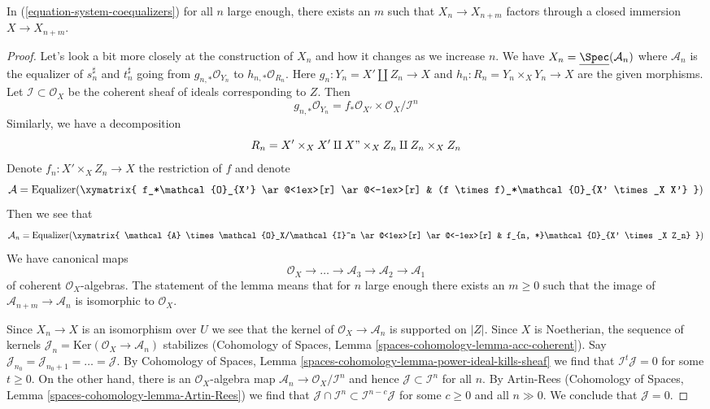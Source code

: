 \begin{lemma}
\label{lemma-essentially-constant}
In (\ref{equation-system-coequalizers}) for all $n$ large enough, there
exists an $m$ such that $X_n \to X_{n + m}$ factors through a
closed immersion $X \to X_{n + m}$.
\end{lemma}

\begin{proof}
Let's look a bit more closely at the construction of $X_n$
and how it changes as we increase $n$. We have
$X_n = \underline{\Spec}(\mathcal{A}_n)$
where $\mathcal{A}_n$ is the equalizer of $s_n^\sharp$ and $t_n^\sharp$
going from $g_{n , *}\mathcal{O}_{Y_n}$ to $h_{n, *}\mathcal{O}_{R_n}$.
Here $g_n : Y_n = X' \amalg Z_n \to X$ and $h_n : R_n = Y_n \times_X Y_n \to X$
are the given morphisms. Let $\mathcal{I} \subset \mathcal{O}_X$ be the
coherent sheaf of ideals corresponding to $Z$. Then
$$
g_{n, *}\mathcal{O}_{Y_n} =
f_*\mathcal{O}_{X'} \times \mathcal{O}_X/\mathcal{I}^n
$$
Similarly, we have a decomposition
$$
R_n = X' \times_X X' \amalg X" \times_X Z_n \amalg Z_n \times_X Z_n
$$
Denote $f_n : X' \times_X Z_n \to X$ the restriction of $f$
and denote
$$
\mathcal{A} = \text{Equalizer}(
\xymatrix{
f_*\mathcal{O}_{X'} \ar@<1ex>[r] \ar@<-1ex>[r] &
(f \times f)_*\mathcal{O}_{X' \times_X X'}
}
)
$$
Then we see that
$$
\mathcal{A}_n =
\text{Equalizer}(
\xymatrix{
\mathcal{A} \times \mathcal{O}_X/\mathcal{I}^n \ar@<1ex>[r] \ar@<-1ex>[r] &
f_{n, *}\mathcal{O}_{X' \times_X Z_n}
}
)
$$
We have canonical maps
$$
\mathcal{O}_X \to \ldots \to \mathcal{A}_3 \to \mathcal{A}_2 \to \mathcal{A}_1
$$
of coherent $\mathcal{O}_X$-algebras. The statement of the lemma means that
for $n$ large enough there exists an $m \geq 0$ such that the image of
$\mathcal{A}_{n + m} \to \mathcal{A}_n$ is isomorphic to $\mathcal{O}_X$.

\medskip\noindent
Since $X_n \to X$ is an isomorphism over $U$ we see that the kernel
of $\mathcal{O}_X \to \mathcal{A}_n$ is supported on $|Z|$.
Since $X$ is Noetherian, the sequence of kernels
$\mathcal{J}_n = \text{Ker}(\mathcal{O}_X \to \mathcal{A}_n)$ stabilizes
(Cohomology of Spaces, Lemma \ref{spaces-cohomology-lemma-acc-coherent}).
Say $\mathcal{J}_{n_0} = \mathcal{J}_{n_0 + 1} = \ldots = \mathcal{J}$.
By Cohomology of Spaces, Lemma
\ref{spaces-cohomology-lemma-power-ideal-kills-sheaf}
we find that $\mathcal{I}^t \mathcal{J} = 0$ for some $t \geq 0$.
On the other hand, there is an $\mathcal{O}_X$-algebra map
$\mathcal{A}_n \to \mathcal{O}_X/\mathcal{I}^n$
and hence $\mathcal{J} \subset \mathcal{I}^n$ for all $n$.
By Artin-Rees (Cohomology of Spaces, Lemma
\ref{spaces-cohomology-lemma-Artin-Rees}) we find that
$\mathcal{J} \cap \mathcal{I}^n \subset \mathcal{I}^{n - c}\mathcal{J}$
for some $c  \geq 0$ and all $n \gg 0$. We conclude that $\mathcal{J} = 0$.


\end{proof}
